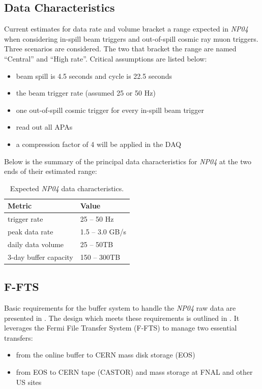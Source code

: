 \documentclass[pdftex,12pt,letter]{article}
\newcommand{\expname}{\textit{NP04}\xspace}
\begin{document}
\subsection{Data Characteristics}

Current estimates \cite{docdb1086} for data rate and volume bracket a range expected
in \expname \cite{docdb186} when considering in-spill beam triggers and out-of-spill cosmic ray muon triggers.
Three scenarios are considered.  The two that bracket the range are named ``Central'' and ``High rate''.  
Critical assumptions are listed below:
\begin{itemize}
\item beam spill is 4.5 seconds and cycle is 22.5 seconds
\item the beam trigger rate (assumed 25 or 50 Hz)
\item one out-of-spill cosmic trigger for every in-spill beam trigger
\item read out all APAs
\item a compression factor of 4 will be applied in the DAQ
\end{itemize}

\noindent Below is the summary of the principal data characteristics for \expname at the two ends of their estimated range:

\begin{table}[tbh]
\centering
\begin{tabular}{l l}
\hline
\textbf{Metric} & \textbf{Value} \\
\hline
\hline
trigger rate            & 25 -- 50 Hz \\  \hline
peak data rate          & 1.5 -- 3.0 GB/s \\ \hline
daily data volume       &  25 -- 50TB \\ \hline
3-day buffer capacity   & 150 -- 300TB \\  \hline
\hline
\end{tabular}
\caption{\label{tab:data_char}Expected \expname data characteristics.}
\end{table}

\subsection{F-FTS}
\label{sec:f-fts}
Basic requirements for the buffer system to handle the \expname raw data are presented in \cite{docdb1209}.
The design which meets these requirements is outlined in \cite{docdb1212}. It leverages the
Fermi File Transfer System (F-FTS) to manage two essential transfers:
\begin{itemize}
\item from the online buffer to CERN mass disk storage (EOS)
\item from EOS to CERN tape (CASTOR) and  mass storage at FNAL and other US sites
\end{itemize}
\end{document}
